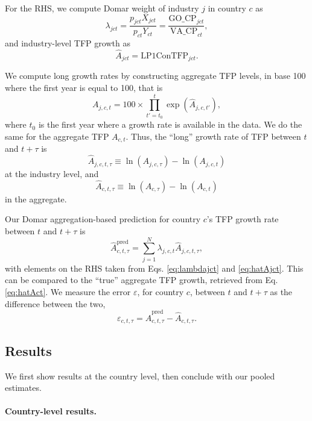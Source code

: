 For the RHS, we compute Domar weight of industry $j$ in country $c$ as
\begin{equation}
    \lambda_{jct} = \frac{p_{jct} X_{jct}}{p_{ct} Y_{ct}} = \frac{\text{GO\_CP}_{jct} }{\text{VA\_CP}_{ct} },
    \label{eq:lambdajct}
\end{equation}
and industry-level TFP growth as
\[
\hat{A}_{jct} = \text{LP1ConTFP}_{jct}.
\]

We compute long growth rates by constructing aggregate TFP levels, in base 100 where the first year is equal to 100, that is 
\[
A_{j,c,t} = 100 \times \prod_{t'={t_0}}^t  \exp{(\hat{A}_{j,c,t'})},
\]
where $t_0$ is the first year where a growth rate is available in the data. We do the same for the aggregate TFP $A_{c,t}$. Thus, the ``long'' growth rate of TFP between $t$ and $t+\tau$ is
\begin{equation}
    \hat{A}_{j,c,t,\tau} \equiv \ln(A_{j,c,\tau})-\ln(A_{j,c,t})
    \label{eq:hatAjct}
\end{equation}
at the industry level, and
\begin{equation}
    \hat{A}_{c,t,\tau} \equiv \ln(A_{c,\tau})-\ln(A_{c,t})
    \label{eq:hatAct}
\end{equation}
in the aggregate.

Our Domar aggregation-based prediction for country $c$'s TFP growth rate between $t$ and $t+\tau$ is
\begin{equation}
 \hat{A}_{c,t,\tau}^\text{pred} = \sum_{j=1}^N \lambda_{j,c,t} \hat{A}_{j,c,t,\tau},
\label{eq:Acttau_pred}
\end{equation}
with elements on the RHS taken from Eqs. \ref{eq:lambdajct} and \ref{eq:hatAjct}. This can be compared to the ``true'' aggregate TFP growth, retrieved from Eq. \ref{eq:hatAct}. We measure the error $\varepsilon$, for country $c$, between $t$ and $t+\tau$ as the difference between the two,
\begin{equation}
    \varepsilon_{c,t,\tau}=  \hat{A}_{c,t,\tau}^\text{pred} - \hat{A}_{c,t,\tau}.
    \label{eq:varepsiloncttau}
\end{equation}

\subsection{Results}

We first show results at the country level, then conclude with our pooled estimates. 


\paragraph{Country-level results.} 


